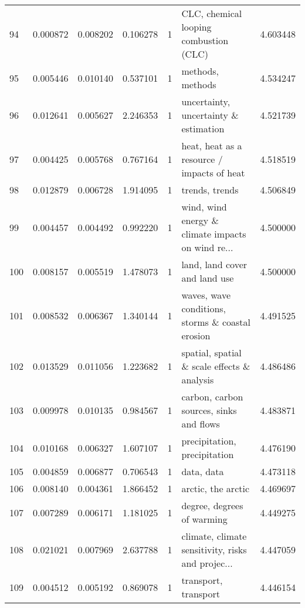 \begin{tabular}{lrrrrlr}
94  &    0.000872 &  0.008202 &        0.106278 &           1 &             CLC, chemical looping combustion (CLC) &  4.603448 \\
95  &    0.005446 &  0.010140 &        0.537101 &           1 &                                   methods, methods &  4.534247 \\
96  &    0.012641 &  0.005627 &        2.246353 &           1 &              uncertainty, uncertainty \& estimation &  4.521739 \\
97  &    0.004425 &  0.005768 &        0.767164 &           1 &         heat, heat as a resource / impacts of heat &  4.518519 \\
98  &    0.012879 &  0.006728 &        1.914095 &           1 &                                     trends, trends &  4.506849 \\
99  &    0.004457 &  0.004492 &        0.992220 &           1 &  wind, wind energy \& climate impacts on wind re... &  4.500000 \\
100 &    0.008157 &  0.005519 &        1.478073 &           1 &                      land, land cover and land use &  4.500000 \\
101 &    0.008532 &  0.006367 &        1.340144 &           1 &   waves, wave conditions, storms \& coastal erosion &  4.491525 \\
102 &    0.013529 &  0.011056 &        1.223682 &           1 &        spatial, spatial \& scale effects \& analysis &  4.486486 \\
103 &    0.009978 &  0.010135 &        0.984567 &           1 &            carbon, carbon sources, sinks and flows &  4.483871 \\
104 &    0.010168 &  0.006327 &        1.607107 &           1 &                       precipitation, precipitation &  4.476190 \\
105 &    0.004859 &  0.006877 &        0.706543 &           1 &                                         data, data &  4.473118 \\
106 &    0.008140 &  0.004361 &        1.866452 &           1 &                                 arctic, the arctic &  4.469697 \\
107 &    0.007289 &  0.006171 &        1.181025 &           1 &                         degree, degrees of warming &  4.449275 \\
108 &    0.021021 &  0.007969 &        2.637788 &           1 &  climate, climate sensitivity, risks and projec... &  4.447059 \\
109 &    0.004512 &  0.005192 &        0.869078 &           1 &                               transport, transport &  4.446154 \\

\end{tabular}
